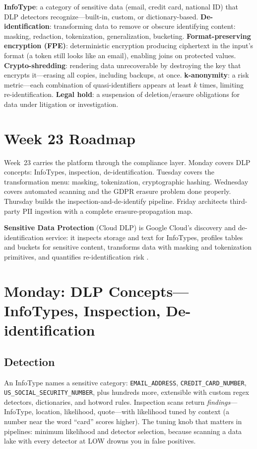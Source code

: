 \begin{keyterms}
\textbf{InfoType}: a category of sensitive data (email, credit card, national ID) that DLP detectors recognize---built-in, custom, or dictionary-based.
\textbf{De-identification}: transforming data to remove or obscure identifying content: masking, redaction, tokenization, generalization, bucketing.
\textbf{Format-preserving encryption (FPE)}: deterministic encryption producing ciphertext in the input's format (a token still looks like an email), enabling joins on protected values.
\textbf{Crypto-shredding}: rendering data unrecoverable by destroying the key that encrypts it---erasing all copies, including backups, at once.
\textbf{k-anonymity}: a risk metric---each combination of quasi-identifiers appears at least $k$ times, limiting re-identification.
\textbf{Legal hold}: a suspension of deletion/erasure obligations for data under litigation or investigation.
\end{keyterms}

\section{Week 23 Roadmap}
Week~23 carries the platform through the compliance layer. Monday covers DLP concepts: InfoTypes, inspection, de-identification. Tuesday covers the transformation menu: masking, tokenization, cryptographic hashing. Wednesday covers automated scanning and the GDPR erasure problem done properly. Thursday builds the inspection-and-de-identify pipeline. Friday architects third-party PII ingestion with a complete erasure-propagation map.

\begin{definitionbox}
\textbf{Sensitive Data Protection} (Cloud DLP) is Google Cloud's discovery and de-identification service: it inspects storage and text for InfoTypes, profiles tables and buckets for sensitive content, transforms data with masking and tokenization primitives, and quantifies re-identification risk \cite{googleclouddlpdocs}.
\end{definitionbox}

\section{Monday: DLP Concepts---InfoTypes, Inspection, De-identification}

\subsection{Detection}
An InfoType names a sensitive category: \texttt{EMAIL\_ADDRESS}, \texttt{CREDIT\_CARD\_NUMBER}, \texttt{US\_SOCIAL\_SECURITY\_NUMBER}, plus hundreds more, extensible with custom regex detectors, dictionaries, and hotword rules. Inspection scans return \emph{findings}---InfoType, location, likelihood, quote---with likelihood tuned by context (a number near the word ``card'' scores higher). The tuning knob that matters in pipelines: minimum likelihood and detector selection, because scanning a data lake with every detector at LOW drowns you in false positives.

